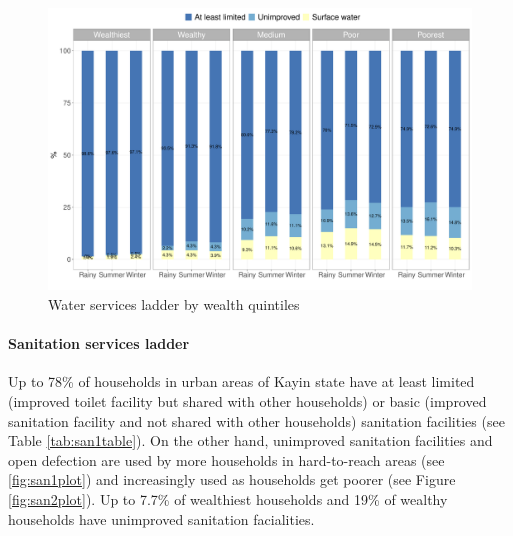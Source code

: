 \documentclass[12pt,a4paper]{article}
\let\oldparagraph\paragraph
\renewcommand{\paragraph}[1]{\oldparagraph{#1}\mbox{}}
\begin{document}
\begin{figure}[H]

{\centering \includegraphics{kayinReport_files/figure-latex/wash2plot-1} 

}

\caption{Water services ladder by wealth quintiles}\label{fig:wash2plot}
\end{figure}

\hypertarget{sanitation-services-ladder}{%
\paragraph{Sanitation services ladder}\label{sanitation-services-ladder}}

Up to 78\% of households in urban areas of Kayin state have at least limited (improved toilet facility but shared with other households) or basic (improved sanitation facility and not shared with other households) sanitation facilities (see Table \ref{tab:san1table}). On the other hand, unimproved sanitation facilities and open defection are used by more households in hard-to-reach areas (see \ref{fig:san1plot}) and increasingly used as households get poorer (see Figure \ref{fig:san2plot}). Up to 7.7\% of wealthiest households and 19\% of wealthy households have unimproved sanitation facialities.
\end{document}
